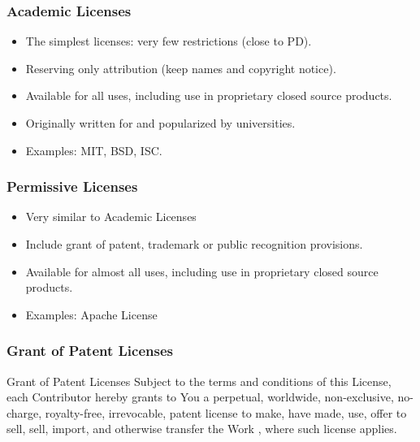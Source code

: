 \documentclass{beamer}
\begin{document}

\begin{frame}
\frametitle{Academic Licenses}

\begin{itemize}
\item The simplest licenses: very few restrictions (close to PD).
\item Reserving only attribution (keep names and copyright notice).
\item Available for all uses, including use in proprietary closed source products.
\item Originally written for and popularized by universities.
\pause
\item \alert{Examples}: MIT, BSD, ISC.
\end{itemize}

\end{frame}


\begin{frame}
\frametitle{Permissive Licenses}

\begin{itemize}
\item Very similar to Academic Licenses
\item Include grant of patent, trademark or public recognition provisions.
\item Available for almost all uses, including use in proprietary closed source products.
\pause
\item \alert{Examples}: Apache License 
\end{itemize}

\end{frame}


\begin{frame}
\frametitle{Grant of Patent Licenses}

\begin{block}{Grant of Patent Licenses}
Subject to the terms and conditions of this License, each Contributor hereby grants to You a perpetual, worldwide, non-exclusive, no-charge, royalty-free, irrevocable, patent license to make, have made, use, offer to sell, sell, import, and otherwise transfer the Work , where such license applies.
\end{block}

\end{frame}
\end{document}
